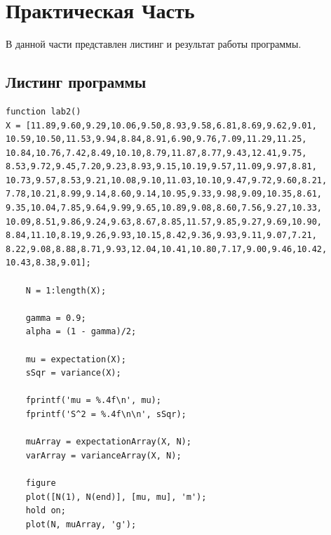 \chapter{Практическая Часть}
В данной части представлен листинг и результат работы программы.
\section{Листинг программы}
\begin{lstlisting}
function lab2()
X = [11.89,9.60,9.29,10.06,9.50,8.93,9.58,6.81,8.69,9.62,9.01,
10.59,10.50,11.53,9.94,8.84,8.91,6.90,9.76,7.09,11.29,11.25,
10.84,10.76,7.42,8.49,10.10,8.79,11.87,8.77,9.43,12.41,9.75,
8.53,9.72,9.45,7.20,9.23,8.93,9.15,10.19,9.57,11.09,9.97,8.81,
10.73,9.57,8.53,9.21,10.08,9.10,11.03,10.10,9.47,9.72,9.60,8.21,
7.78,10.21,8.99,9.14,8.60,9.14,10.95,9.33,9.98,9.09,10.35,8.61,
9.35,10.04,7.85,9.64,9.99,9.65,10.89,9.08,8.60,7.56,9.27,10.33,
10.09,8.51,9.86,9.24,9.63,8.67,8.85,11.57,9.85,9.27,9.69,10.90,
8.84,11.10,8.19,9.26,9.93,10.15,8.42,9.36,9.93,9.11,9.07,7.21,
8.22,9.08,8.88,8.71,9.93,12.04,10.41,10.80,7.17,9.00,9.46,10.42,
10.43,8.38,9.01];

    N = 1:length(X);
    
    gamma = 0.9;
    alpha = (1 - gamma)/2;

    mu = expectation(X);
    sSqr = variance(X); 

    fprintf('mu = %.4f\n', mu); 
    fprintf('S^2 = %.4f\n\n', sSqr);

    muArray = expectationArray(X, N);
    varArray = varianceArray(X, N);
 
    figure
    plot([N(1), N(end)], [mu, mu], 'm');
    hold on;
    plot(N, muArray, 'g');
\end{lstlisting}

